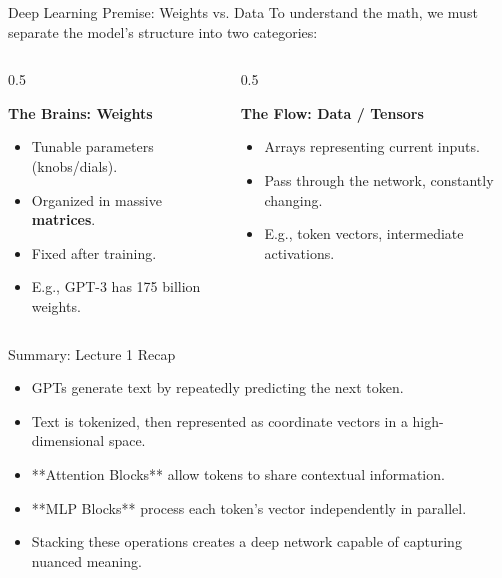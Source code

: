 \documentclass[aspectratio=169]{beamer}
\begin{document}
\begin{frame}{Deep Learning Premise: Weights vs. Data}
  To understand the math, we must separate the model's structure into two categories:
  
  \begin{columns}
    \begin{column}{0.5\textwidth}
      \begin{block}{\textbf{The Brains: Weights}}
        \begin{itemize}
          \item Tunable parameters (knobs/dials).
          \item Organized in massive \textbf{matrices}.
          \item Fixed after training.
          \item E.g., GPT-3 has 175 billion weights.
        \end{itemize}
      \end{block}
    \end{column}
    \begin{column}{0.5\textwidth}
      \begin{block}{\textbf{The Flow: Data / Tensors}}
        \begin{itemize}
          \item Arrays representing current inputs.
          \item Pass through the network, constantly changing.
          \item E.g., token vectors, intermediate activations.
        \end{itemize}
      \end{block}
    \end{column}
  \end{columns}
\end{frame}

\begin{frame}{Summary: Lecture 1 Recap}
  \begin{itemize}
    \item GPTs generate text by repeatedly predicting the next token.
    \item Text is tokenized, then represented as coordinate vectors in a high-dimensional space.
    \item **Attention Blocks** allow tokens to share contextual information.
    \item **MLP Blocks** process each token's vector independently in parallel.
    \item Stacking these operations creates a deep network capable of capturing nuanced meaning.
  \end{itemize}
\end{frame}
\end{document}
